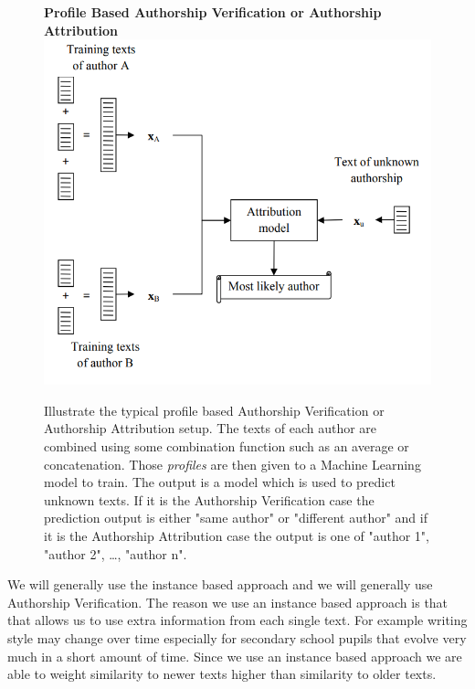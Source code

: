 \begin{figure}[htb]
    \centering
    \textbf{Profile Based Authorship Verification or Authorship Attribution}
    \includegraphics[scale=0.4]{./pictures/ProfileBased.png}

    \caption{Illustrate the typical profile based Authorship Verification
    or Authorship Attribution setup.\cite{stamatos2009} The texts of each
    author are combined using some combination function such as an average or
    concatenation. Those \textit{profiles} are then given to a Machine Learning
    model to train. The output is a model which is used to predict unknown
    texts. If it is the Authorship Verification case the prediction output is
    either "same author" or "different author" and if it is the Authorship
    Attribution case the output is one of "author 1", "author 2", \dots, "author
    n".}
    
    \label{fig:profile_based}
\end{figure}

We will generally use the instance based approach and we will generally use
Authorship Verification. The reason we use an instance based approach is that
that allows us to use extra information from each single text. For example
writing style may change over time especially for secondary school pupils that
evolve very much in a short amount of time. Since we use an instance based
approach we are able to weight similarity to newer texts higher than similarity
to older texts.


